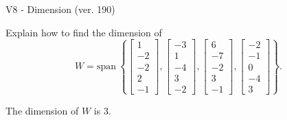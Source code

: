 \begin{exercise}
  \begin{exerciseTitle}V8 - Dimension (ver. 190)\end{exerciseTitle}
  \begin{exerciseStatement}
    Explain how to find the dimension of 
\[W=\mathrm{span}\ \left\{\left[\begin{array}{r}
1 \\
-2 \\
-2 \\
2 \\
-1
\end{array}\right] , \left[\begin{array}{r}
-3 \\
1 \\
-4 \\
3 \\
-2
\end{array}\right] , \left[\begin{array}{r}
6 \\
-7 \\
-2 \\
3 \\
-1
\end{array}\right] , \left[\begin{array}{r}
-2 \\
-1 \\
0 \\
-4 \\
3
\end{array}\right]\right\}.\]



  \end{exerciseStatement}
  \begin{exerciseAnswer}
   The dimension of \(W\) is  \(3\).
  


  \end{exerciseAnswer}
\end{exercise}
